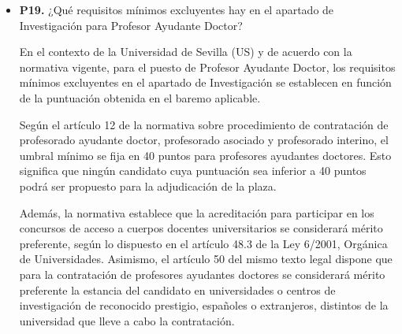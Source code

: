 \documentclass{article}
\begin{document}
\begin{itemize}
\begin{respuesta_agente}
Para determinar la puntuación exacta por mes de experiencia docente, sería necesario conocer el baremo específico utilizado por la Universidad de Sevilla o la fórmula de cálculo aplicada. Sin embargo, según el contexto proporcionado, la experiencia docente se valora en función de la dedicación a tiempo completo o parcial, y se consideran factores como el número de ECTS o horas impartidas.

En el caso de PTU (Profesorado Titular de Universidad), se requiere una experiencia docente mínima de 4 años de dedicación a tiempo completo, o su equivalente a tiempo parcial, con un mínimo de 24 ECTS o 240 horas impartidas. En el caso de CU (Catedrático de Universidad), se requiere una experiencia docente mínima de 10 años de dedicación a tiempo completo, o su equivalente a tiempo parcial, con un mínimo de 140 ECTS.

En resumen, no se puede proporcionar una respuesta directa a la pregunta sobre la puntuación por mes de experiencia docente sin conocer el baremo específico o la fórmula de cálculo aplicada. Sin embargo, se puede concluir que la experiencia docente es un criterio importante en la evaluación y que se valora en función de la dedicación y el número de ECTS o horas impartidas.
    \end{respuesta_agente}
    \vspace{0.2cm}
    \noindent\textbf{Documentos recuperados:} No se detectaron fuentes.

  \item \textbf{P19.} ¿Qué requisitos mínimos excluyentes hay en el apartado de Investigación para Profesor Ayudante Doctor? \\
    \begin{respuesta_agente}
      En el contexto de la Universidad de Sevilla (US) y de acuerdo con la normativa vigente, para el puesto de Profesor Ayudante Doctor, los requisitos mínimos excluyentes en el apartado de Investigación se establecen en función de la puntuación obtenida en el baremo aplicable. 

Según el artículo 12 de la normativa sobre procedimiento de contratación de profesorado ayudante doctor, profesorado asociado y profesorado interino, el umbral mínimo se fija en 40 puntos para profesores ayudantes doctores. Esto significa que ningún candidato cuya puntuación sea inferior a 40 puntos podrá ser propuesto para la adjudicación de la plaza.

Además, la normativa establece que la acreditación para participar en los concursos de acceso a cuerpos docentes universitarios se considerará mérito preferente, según lo dispuesto en el artículo 48.3 de la Ley 6/2001, Orgánica de Universidades. Asimismo, el artículo 50 del mismo texto legal dispone que para la contratación de profesores ayudantes doctores se considerará mérito preferente la estancia del candidato en universidades o centros de investigación de reconocido prestigio, españoles o extranjeros, distintos de la universidad que lleve a cabo la contratación.


\end{respuesta_agente}
\end{itemize}
\end{document}
